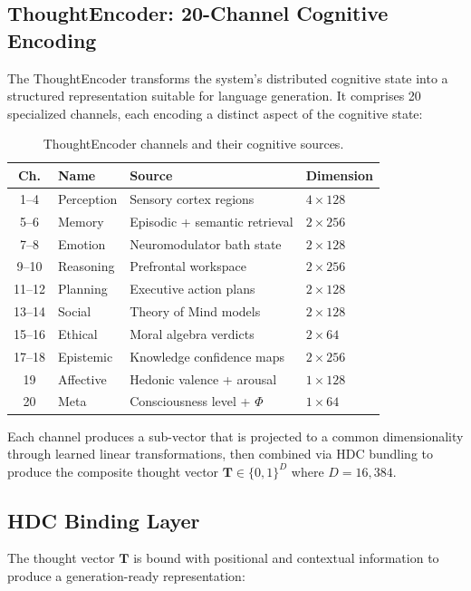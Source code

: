 \documentclass[12pt,a4paper]{article}
\begin{document}
\subsection{ThoughtEncoder: 20-Channel Cognitive Encoding}

The ThoughtEncoder transforms the system's distributed cognitive state into a structured representation suitable for language generation. It comprises 20 specialized channels, each encoding a distinct aspect of the cognitive state:

\begin{table}[H]
\centering
\caption{ThoughtEncoder channels and their cognitive sources.}
\label{tab:channels}
\begin{tabular}{clll}
\toprule
\textbf{Ch.} & \textbf{Name} & \textbf{Source} & \textbf{Dimension} \\
\midrule
1--4 & Perception & Sensory cortex regions & $4 \times 128$ \\
5--6 & Memory & Episodic + semantic retrieval & $2 \times 256$ \\
7--8 & Emotion & Neuromodulator bath state & $2 \times 128$ \\
9--10 & Reasoning & Prefrontal workspace & $2 \times 256$ \\
11--12 & Planning & Executive action plans & $2 \times 128$ \\
13--14 & Social & Theory of Mind models & $2 \times 128$ \\
15--16 & Ethical & Moral algebra verdicts & $2 \times 64$ \\
17--18 & Epistemic & Knowledge confidence maps & $2 \times 256$ \\
19 & Affective & Hedonic valence + arousal & $1 \times 128$ \\
20 & Meta & Consciousness level + $\Phi$ & $1 \times 64$ \\
\bottomrule
\end{tabular}
\end{table}

Each channel produces a sub-vector that is projected to a common dimensionality through learned linear transformations, then combined via HDC bundling to produce the composite thought vector $\mathbf{T} \in \{0,1\}^{D}$ where $D = 16{,}384$.

\subsection{HDC Binding Layer}

The thought vector $\mathbf{T}$ is bound with positional and contextual information to produce a generation-ready representation:
\end{document}
